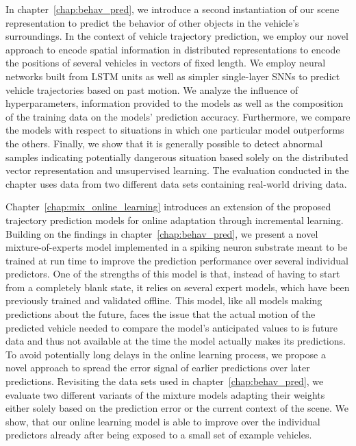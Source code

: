 In chapter~\ref{chap:behav_pred}, we introduce a second instantiation of our scene representation to predict the behavior of other objects in the vehicle's surroundings.
In the context of vehicle trajectory prediction, we employ our novel approach to encode spatial information in distributed representations to encode the positions of several vehicles in vectors of fixed length.
We employ neural networks built from \ac{LSTM} units as well as simpler single-layer \acp{SNN} to predict vehicle trajectories based on past motion.
We analyze the influence of hyperparameters, information provided to the models as well as the composition of the training data on the models' prediction accuracy.
Furthermore, we compare the models with respect to situations in which one particular model outperforms the others.
Finally, we show that it is generally possible to detect abnormal samples indicating potentially dangerous situation based solely on the distributed vector representation and unsupervised learning.
The evaluation conducted in the chapter uses data from two different data sets containing real-world driving data.

Chapter~\ref{chap:mix_online_learning} introduces an extension of the proposed trajectory prediction models for online adaptation through incremental learning.
Building on the findings in chapter~\ref{chap:behav_pred}, we present a novel mixture-of-experts model implemented in a spiking neuron substrate meant to be trained at run time to improve the prediction performance over several individual predictors.
One of the strengths of this model is that, instead of having to start from a completely blank state, it relies on several expert models, which have been previously trained and validated offline.
This model, like all models making predictions about the future, faces the issue that the actual motion of the predicted vehicle needed to compare the model's anticipated values to is future data and thus not available at the time the model actually makes its predictions.
To avoid potentially long delays in the online learning process, we propose a novel approach to spread the error signal of earlier predictions over later predictions.
Revisiting the data sets used in chapter~\ref{chap:behav_pred}, we evaluate two different variants of the mixture models adapting their weights either solely based on the prediction error or the current context of the scene.
We show, that our online learning model is able to improve over the individual predictors already after being exposed to a small set of example vehicles.

